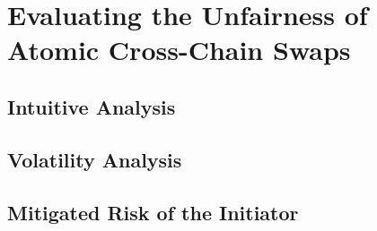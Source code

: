 \section{Evaluating the Unfairness of Atomic Cross-Chain Swaps}
\label{sec:evaluation}

\subsection{Intuitive Analysis}

\subsection{Volatility Analysis}

\subsection{Mitigated Risk of the Initiator}